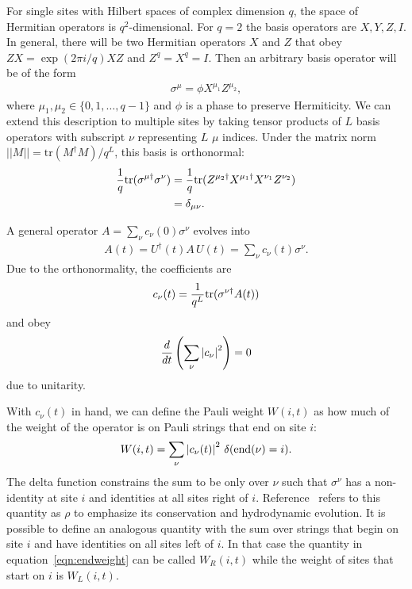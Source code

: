 For single sites with Hilbert spaces of complex dimension $q$, the space of Hermitian operators is $q^2$-dimensional. For $q=2$ the basis operators are $X, Y, Z, I$. In general, there will be two Hermitian operators $X$ and $Z$ that obey $ZX = \exp(2\pi i/q)XZ$ and $Z^q=X^q=I$. Then an arbitrary basis operator will be of the form 
\begin{align}
\sigma^\mu = \phi X^{\mu_1}Z^{\mu_2},
\end{align}
where $\mu_1, \mu_2\in\{0,1,\dots,q-1\}$ and $\phi$ is a phase to preserve Hermiticity. We can extend this description to multiple sites by taking tensor products of $L$ basis operators with subscript $\nu$ representing $L$ $\mu$ indices. Under the matrix norm $||M|| = \text{tr}(M^\dag M)/q^L$, this basis is orthonormal:
\begin{align}
\frac{1}{q}\text{tr}(\sigma^{\mu\dag}\sigma^\nu) &= \frac{1}{q}\text{tr}(Z^{\mu_2\dag}
	X^{\mu_1\dag}X^{\nu_1}Z^{\nu_2})\nonumber\\
&= \delta_{\mu\nu}.\label{eqn:orthonorm}
\end{align}

A general operator $A = \sum_\nu c_{\nu}(0)\sigma^\nu$ evolves into
\begin{align}
A(t) = U^\dag(t)A\,U(t) = \sum_\nu c_\nu(t)\sigma^\nu.\label{eqn:decomp}
\end{align}
Due to the orthonormality, the coefficients are 
\begin{align}
c_\nu(t) = \frac{1}{q^L}\text{tr}(\sigma^{\nu\dag}A(t))
\end{align}
and obey 
\begin{align}
\frac{d}{dt} \left(\sum_\nu \left|c_\nu\right|^2\right) = 0 \nonumber
\end{align}
due to unitarity.

With $c_\nu(t)$ in hand, we can define the Pauli weight $W(i,t)$ as how much of the weight of the operator is on Pauli strings that end on site $i$:
\begin{align}
W(i,t) = \sum_\nu\left|c_\nu(t)\right|^2\,\delta(\text{end}(\nu)=i).
	\label{eqn:endweight}
\end{align}
The delta function constrains the sum to be only over $\nu$ such that $\sigma^\nu$ has a non-identity at site $i$ and identities at all sites right of $i$. Reference~\cite{Keyserlingk} refers to this quantity as $\rho$ to emphasize its conservation and hydrodynamic evolution. It is possible to define an analogous quantity with the sum over strings that begin on site $i$ and have identities on all sites left of $i$. In that case the quantity in equation~\ref{eqn:endweight} can be called $W_R(i,t)$ while the weight of sites that start on $i$ is $W_L(i,t)$.

